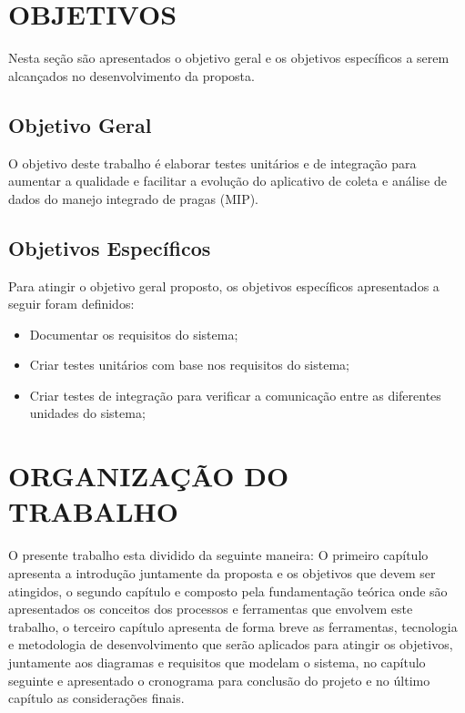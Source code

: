 


\section{OBJETIVOS}

Nesta seção são apresentados o objetivo geral e os objetivos específicos a
serem alcançados no desenvolvimento da proposta.

\subsection{Objetivo Geral}

O objetivo deste trabalho é elaborar testes unitários e de integração para aumentar a qualidade e facilitar a evolução do aplicativo de coleta e análise de dados do manejo integrado de pragas (MIP). 


\subsection{Objetivos Específicos}

Para atingir o objetivo geral proposto, os objetivos específicos
apresentados a seguir foram definidos:



\begin{itemize}
\item Documentar os requisitos do sistema; 
 
\item Criar testes unitários com base nos requisitos do sistema;

\item Criar testes de integração para verificar a comunicação entre as diferentes unidades do sistema;


\end{itemize}

\section{ORGANIZAÇÃO DO TRABALHO}

O presente trabalho esta dividido da seguinte maneira: O primeiro capítulo apresenta a introdução juntamente da proposta e os objetivos que devem ser atingidos, o segundo capítulo e composto pela fundamentação teórica onde são apresentados os conceitos dos processos e ferramentas que envolvem este trabalho, o terceiro capítulo apresenta de forma breve as ferramentas, tecnologia e metodologia de desenvolvimento que serão aplicados para atingir os objetivos, juntamente aos diagramas e requisitos que modelam o sistema, no capítulo seguinte e apresentado o cronograma para conclusão do projeto e no último capítulo as considerações finais.   
